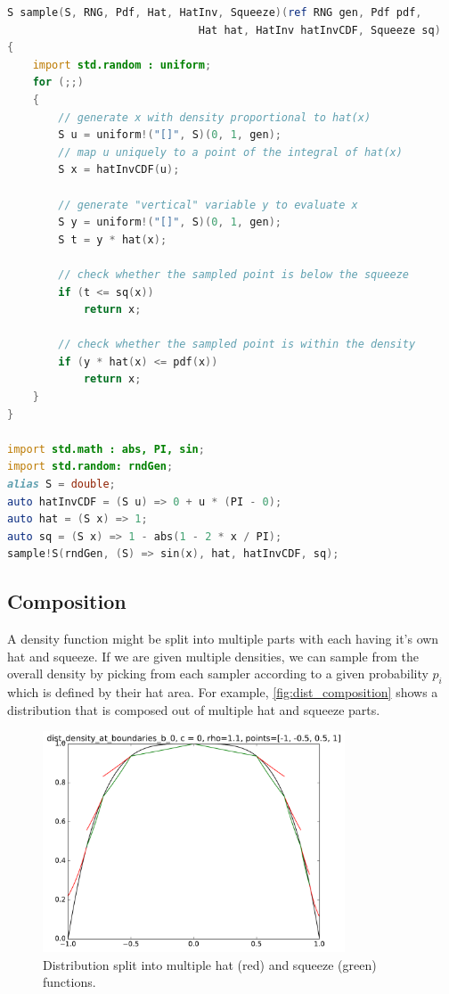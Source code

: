 \begin{minipage}{0.9\linewidth}
\begin{lstlisting}[language=D]
S sample(S, RNG, Pdf, Hat, HatInv, Squeeze)(ref RNG gen, Pdf pdf,
                              Hat hat, HatInv hatInvCDF, Squeeze sq)
{
    import std.random : uniform;
    for (;;)
    {
        // generate x with density proportional to hat(x)
        S u = uniform!("[]", S)(0, 1, gen);
		// map u uniquely to a point of the integral of hat(x)
        S x = hatInvCDF(u);

        // generate "vertical" variable y to evaluate x
        S y = uniform!("[]", S)(0, 1, gen);
        S t = y * hat(x);

        // check whether the sampled point is below the squeeze
        if (t <= sq(x))
            return x;

        // check whether the sampled point is within the density
        if (y * hat(x) <= pdf(x))
            return x;
    }
}

import std.math : abs, PI, sin;
import std.random: rndGen;
alias S = double;
auto hatInvCDF = (S u) => 0 + u * (PI - 0);
auto hat = (S x) => 1;
auto sq = (S x) => 1 - abs(1 - 2 * x / PI);
sample!S(rndGen, (S) => sin(x), hat, hatInvCDF, sq);
\end{lstlisting}
\end{minipage}


\subsection{Composition}
\label{subsection:composition}

A density function might be split into multiple parts with each having it's own hat and squeeze.
If we are given multiple densities, we can sample from the overall density by picking from each sampler according to a given probability $p_i$ which is defined by their hat area.
For example, \autoref{fig:dist_composition} shows a distribution that is composed out of multiple hat and squeeze parts.

\begin{figure}[h!]
\centering
\includegraphics[width=0.8\textwidth]{figs/dist_density_at_boundaries_b_0_hs.pdf}
\caption{Distribution split into multiple hat (red) and squeeze (green) functions.}
\label{fig:dist_composition}
\end{figure}

